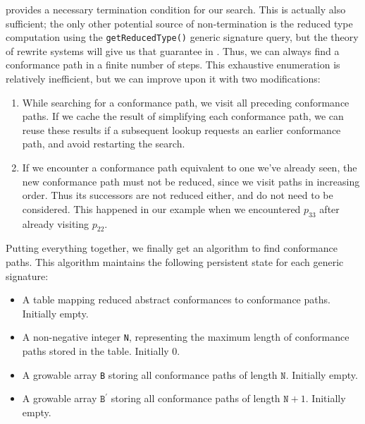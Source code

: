 \documentclass[../generics]{subfiles}
\begin{document}
 provides a necessary termination condition for our search. This is actually also sufficient; the only other potential source of non-termination is the reduced type computation using the \texttt{getReducedType()} generic signature query, but the theory of rewrite systems will give us that guarantee in . Thus, we can always find a conformance path in a finite number of steps. This exhaustive enumeration is relatively inefficient, but we can improve upon it with two modifications:
\begin{enumerate}
\item While searching for a conformance path, we visit all preceding conformance paths. If we cache the result of simplifying each conformance path, we can reuse these results if a subsequent lookup requests an earlier conformance path, and avoid restarting the search.
\item If we encounter a conformance path equivalent to one we've already seen, the new conformance path must not be reduced, since we visit paths in increasing order. Thus its successors are not reduced either, and do not need to be considered. This happened in our example when we encountered $p_{33}$ after already visiting $p_{22}$.
\end{enumerate}
Putting everything together, we finally get an algorithm to find conformance paths. This algorithm maintains the following persistent state for each generic signature:
\begin{itemize}
\item A table mapping reduced abstract conformances to conformance paths. Initially empty.
\item A non-negative integer \texttt{N}, representing the maximum length of conformance paths stored in the table. Initially 0.
\item A growable array \texttt{B} storing all conformance paths of length $\texttt{N}$. Initially empty.
\item A growable array $\texttt{B}^\prime$ storing all conformance paths of length $\texttt{N}+1$. Initially empty.
\end{itemize}
\end{document}
